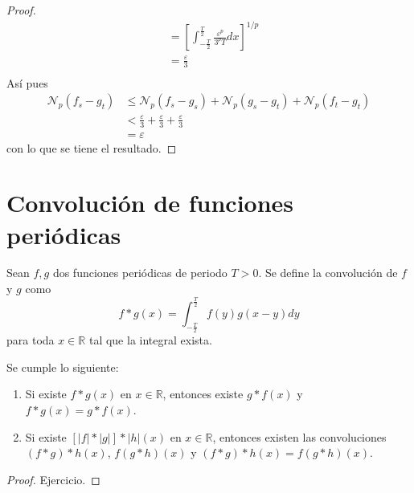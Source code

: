 \documentclass[12pt]{report}
\theoremstyle{largebreak}
\newcommand\abs[1]{\ensuremath{\big|#1\big|}}
\newcommand{\N}[2]{\ensuremath{\mathcal{N}_{#1}\left(#2\right)}}
\begin{document}
\begin{proof}
\begin{equation*}
\begin{split}
                &=\left[\int_{-\frac{T}{2}}^{\frac{T}{2}}\frac{\varepsilon^p}{3^pT} dx \right]^{1/p}\\
                &=\frac{\varepsilon}{3}\\
            \end{split}
        \end{equation*}
        Así pues
        \begin{equation*}
            \begin{split}
                \N{p}{f_s-g_t}&\leq\N{p}{f_s-g_s}+\N{p}{g_s-g_t}+\N{p}{f_t-g_t}\\
                &<\frac{\varepsilon}{3}+\frac{\varepsilon}{3}+\frac{\varepsilon}{3}\\
                &=\varepsilon
            \end{split}
        \end{equation*}
        con lo que se tiene el resultado.
    \end{proof}

    \section{Convolución de funciones periódicas}

    \begin{mydef}
        Sean $f,g$ dos funciones periódicas de periodo $T>0$. Se define la convolución de $f$ y $g$ como
        \begin{equation*}
            f*g(x)=\int_{-\frac{T}{2}}^{\frac{T}{2}}f(y)g(x-y)dy
        \end{equation*}
        para toda $x\in\mathbb{R}$ tal que la integral exista.
    \end{mydef}

    \begin{propo}
        Se cumple lo siguiente:
        \begin{enumerate}
            \item Si existe $f*g(x)$ en $x\in\mathbb{R}$, entonces existe $g*f(x)$ y $f*g(x)=g*f(x)$.
            \item Si existe $[\abs{f}*\abs{g}]*\abs{h}(x)$ en $x\in\mathbb{R}$, entonces existen las convoluciones $(f*g)*h(x)$, $f(g*h)(x)$ y $(f*g)*h(x)=f(g*h)(x)$.
        \end{enumerate}
    \end{propo}

    \begin{proof}
        Ejercicio.
    \end{proof}
\end{document}
